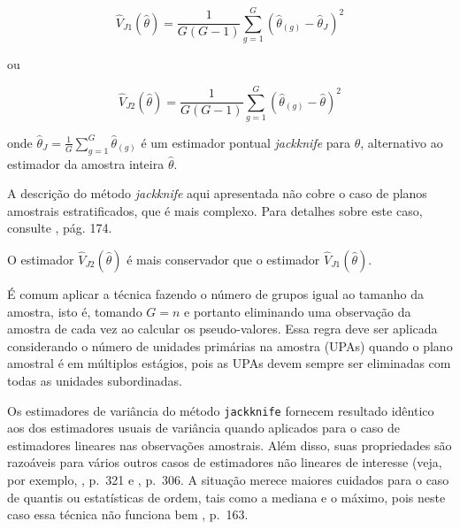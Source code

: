 \documentclass[]{book}
\numberwithin{example}{chapter}
\numberwithin{remark}{chapter}
\numberwithin{definition}{chapter}
\let\BeginKnitrBlock\begin \let\EndKnitrBlock\end
\begin{document}
\begin{equation}
\widehat{V}_{J1}\left( \widehat{\theta }\right) =\frac{1}{G\left( G-1\right) 
}\sum_{g=1}^{G}\left( \widehat{\theta }_{\left( g\right) }-\widehat{\theta }%
_{J}\right) ^{2}  \label{eq:estpa26}
\end{equation}

ou

\begin{equation}
\widehat{V}_{J2}\left( \widehat{\theta }\right) =\frac{1}{G\left( G-1\right) 
}\sum_{g=1}^{G}\left( \widehat{\theta }_{\left( g\right) }-\widehat{\theta }%
\right) ^{2}  \label{eq:estpa27}
\end{equation}

onde
\(\widehat{\theta }_{J}=\frac{1}{G}\sum_{g=1}^{G}\widehat{\theta }_{\left( g\right)}\)
é um estimador pontual \emph{jackknife} para \(\theta\), alternativo ao
estimador da amostra inteira \(\hat{\theta}\).

\BeginKnitrBlock{remark}
A descrição do método \emph{jackknife} aqui
apresentada não cobre o caso de planos amostrais estratificados, que é
mais complexo. Para detalhes sobre este caso, consulte \citep{W85}, pág.
174.
\EndKnitrBlock{remark}

\BeginKnitrBlock{remark}
O estimador
\(\widehat{V}_{J2}\left( \widehat{\theta }\right)\) é mais conservador
que o estimador \(\widehat{V}_{J1}\left( \widehat{\theta }\right)\).
\EndKnitrBlock{remark}

\BeginKnitrBlock{remark}
É comum aplicar a técnica fazendo o número de
grupos igual ao tamanho da amostra, isto é, tomando \(G=n\) e portanto
eliminando uma observação da amostra de cada vez ao calcular os
pseudo-valores. Essa regra deve ser aplicada considerando o número de
unidades primárias na amostra (UPAs) quando o plano amostral é em
múltiplos estágios, pois as UPAs devem sempre ser eliminadas com todas
as unidades subordinadas.
\EndKnitrBlock{remark}

Os estimadores de variância do método \texttt{jackknife} fornecem
resultado idêntico aos dos estimadores usuais de variância quando
aplicados para o caso de estimadores lineares nas observações amostrais.
Além disso, suas propriedades são razoáveis para vários outros casos de
estimadores não lineares de interesse (veja, por exemplo,
\citep{cochran}, p.~321 e \citep{W85}, p.~306. A situação merece maiores
cuidados para o caso de quantis ou estatísticas de ordem, tais como a
mediana e o máximo, pois neste caso essa técnica não funciona bem
\citep{W85}, p.~163.
\end{document}
